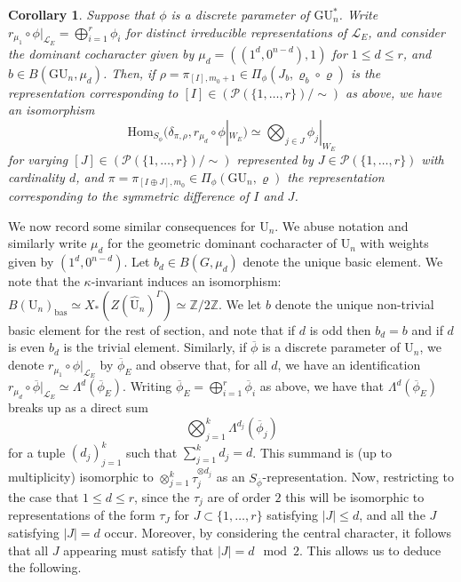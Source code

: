 \documentclass[reqno,11pt]{amsart}
\newtheorem{corollary}[theorem]{Corollary}
\theoremstyle{remark}
\newcommand{\GU}{\mathrm{GU}}
\newcommand{\U}{\mathrm{U}}
\newcommand{\mc}{\mathcal}
\newcommand{\ov}{\overline}
\newcommand{\bas}{\mathrm{bas}}
\begin{document}
\begin{corollary}{\label{extmucor}}
Suppose that $\phi$ is a discrete parameter of $\GU^*_{n}$. Write $r_{\mu_{1}} \circ \phi|_{\mathcal{L}_{E}} = \bigoplus_{i = 1}^{r} \phi_{i}$ for distinct irreducible representations of $\mathcal{L}_{E}$, and consider the dominant cocharacter given by $\mu_{d} = ((1^{d},0^{n - d}),1)$ for $1 \leq d \leq r$, and $b \in B(\GU_{n},\mu_{d})$. Then, if $\rho = \pi_{[I],m_0+1} \in \Pi_{\phi}(J_b, \varrho_{b} \circ \varrho)$ is the representation corresponding to $[I] \in (\mc{P}(\{1, \dots, r\})/ \sim)$ as above, we have an isomorphism 
\[ \mathrm{Hom}_{S_{\phi}}(\delta_{\pi,\rho},r_{\mu_{d}} \circ \phi|_{W_{E}}) \simeq \bigotimes_{j \in J} \phi_{j}|_{W_E} \]
for varying $[J] \in (\mc{P}(\{1, \dots, r\})/ \sim)$ represented by $J \in \mc{P}(\{1, \dots, r\})$ with cardinality $d$, and $\pi = \pi_{[I \oplus J],m_0} \in \Pi_{\phi}(\GU_{n},\varrho)$ the representation corresponding to the symmetric difference of $I$ and $J$. 
\end{corollary}
We now record some similar consequences for $\U_{n}$. We abuse notation and similarly write $\mu_{d}$ for the geometric dominant cocharacter of $\U_{n}$ with weights given by $(1^{d},0^{n-d})$. Let $b_d \in B(G,\mu_{d})$ denote the unique basic element. We note that the $\kappa$-invariant induces an isomorphism: $B(\U_{n})_{\bas} \simeq X_*(Z(\hat{\U}_{n})^{\Gamma}) \simeq \mathbb{Z}/2\mathbb{Z}$. We let $b$ denote the unique non-trivial basic element for the rest of section, and note that if $d$ is odd then $b_{d} = b$ and if $d$ is even $b_{d}$ is the trivial element. Similarly, if $\ov{\phi}$ is a discrete parameter of $\U_{n}$, we denote $r_{\mu_{1}} \circ \phi|_{\mc{L}_{E}}$ by $\ov{\phi}_{E}$ and observe that, for all $d$, we have an identification $r_{\mu_{d}} \circ \ov{\phi}|_{\mc{L}_{E}} \simeq \Lambda^{d}(\ov{\phi}_{E})$. Writing $\ov{\phi}_{E} = \bigoplus_{i = 1}^{r} \ov{\phi}_i$ as above, we have that $\Lambda^{d}(\ov{\phi}_{E})$ breaks up as a direct sum 
\[ \bigotimes_{j = 1}^{k} \Lambda^{d_{j}}(\ov{\phi}_{j}) \] 
for a tuple $(d_{j})_{j = 1}^{k}$ such that $\sum_{j = 1}^{k} d_{j} = d$. This summand is (up to multiplicity) isomorphic to $\otimes_{j = 1}^{k} \tau_{j}^{\otimes d_{j}}$
as an $S_{\ov{\phi}}$-representation. Now, restricting to the case that $1 \leq d \leq r$, since the $\tau_{j}$ are of order $2$ this will be isomorphic to representations of the form $\tau_{J}$ for $J \subset \{1,\ldots,r\}$ satisfying $|J| \leq d$, and all the $J$ satisfying $|J| = d$ occur. Moreover, by considering the central character, it follows that all $J$ appearing must satisfy that $|J| = d \mod 2$. This allows us to deduce the following. 
\end{document}
